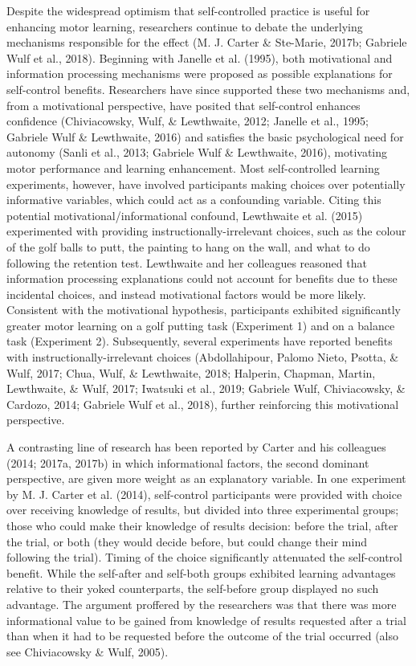 \documentclass[
  english,
  man, donotrepeattitle,floatsintext]{apa7}
\begin{document}
Despite the widespread optimism that self-controlled practice is useful for enhancing motor learning, researchers continue to debate the underlying mechanisms responsible for the effect (M. J. Carter \& Ste-Marie, 2017b; Gabriele Wulf et al., 2018). Beginning with Janelle et al. (1995), both motivational and information processing mechanisms were proposed as possible explanations for self-control benefits. Researchers have since supported these two mechanisms and, from a motivational perspective, have posited that self-control enhances confidence (Chiviacowsky, Wulf, \& Lewthwaite, 2012; Janelle et al., 1995; Gabriele Wulf \& Lewthwaite, 2016) and satisfies the basic psychological need for autonomy (Sanli et al., 2013; Gabriele Wulf \& Lewthwaite, 2016), motivating motor performance and learning enhancement. Most self-controlled learning experiments, however, have involved participants making choices over potentially informative variables, which could act as a confounding variable. Citing this potential motivational/informational confound, Lewthwaite et al. (2015) experimented with providing instructionally-irrelevant choices, such as the colour of the golf balls to putt, the painting to hang on the wall, and what to do following the retention test. Lewthwaite and her colleagues reasoned that information processing explanations could not account for benefits due to these incidental choices, and instead motivational factors would be more likely. Consistent with the motivational hypothesis, participants exhibited significantly greater motor learning on a golf putting task (Experiment 1) and on a balance task (Experiment 2). Subsequently, several experiments have reported benefits with instructionally-irrelevant choices (Abdollahipour, Palomo Nieto, Psotta, \& Wulf, 2017; Chua, Wulf, \& Lewthwaite, 2018; Halperin, Chapman, Martin, Lewthwaite, \& Wulf, 2017; Iwatsuki et al., 2019; Gabriele Wulf, Chiviacowsky, \& Cardozo, 2014; Gabriele Wulf et al., 2018), further reinforcing this motivational perspective.

A contrasting line of research has been reported by Carter and his colleagues (2014; 2017a, 2017b) in which informational factors, the second dominant perspective, are given more weight as an explanatory variable. In one experiment by M. J. Carter et al. (2014), self-control participants were provided with choice over receiving knowledge of results, but divided into three experimental groups; those who could make their knowledge of results decision: before the trial, after the trial, or both (they would decide before, but could change their mind following the trial). Timing of the choice significantly attenuated the self-control benefit. While the self-after and self-both groups exhibited learning advantages relative to their yoked counterparts, the self-before group displayed no such advantage. The argument proffered by the researchers was that there was more informational value to be gained from knowledge of results requested after a trial than when it had to be requested before the outcome of the trial occurred (also see Chiviacowsky \& Wulf, 2005).
\end{document}
